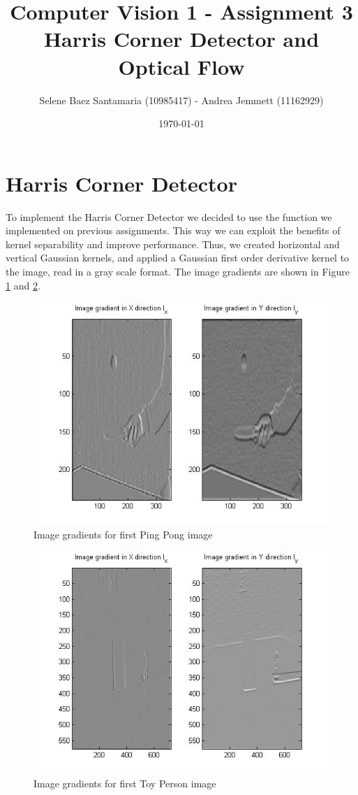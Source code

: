 \documentclass[11pt]{article}
\title{
	{Computer Vision 1 - Assignment 3 \\
	Harris Corner Detector and Optical Flow}
}
\author{
Selene Baez Santamaria (10985417) - Andrea Jemmett (11162929)}
\date{\today}
\begin{document}
\maketitle

\section{Harris Corner Detector}
To implement the Harris Corner Detector we decided to use the function we
implemented on previous assignments. This way we can exploit the benefits of
kernel separability and improve performance. Thus, we created horizontal and
vertical Gaussian kernels, and applied a Gaussian first order derivative kernel to
the image, read in a gray scale format. The image gradients are shown in Figure
\ref{fig:partialDerivatives_pingpong} and \ref{fig:partialDerivatives_person}.

\begin{figure}[H] \centering
	\includegraphics[width=.8\textwidth]{imgs/derivatives_pingpong.jpg}
	\caption{Image gradients for first Ping Pong image}
	\label{fig:partialDerivatives_pingpong}
\end{figure}

\begin{figure}[H] \centering
	\includegraphics[width=.8\textwidth]{imgs/derivatives_person.jpg}
	\caption{Image gradients for first Toy Person image}
	\label{fig:partialDerivatives_person}
\end{figure}
\end{document}
